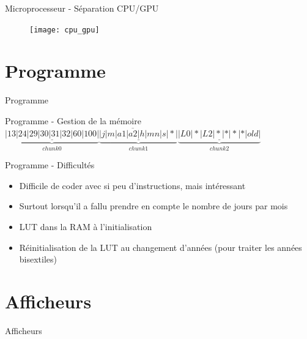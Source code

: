 \documentclass[handout]{beamer}
\begin{document}
\begin{frame}{Microprocesseur - Séparation CPU/GPU}
	\begin{figure}
		\centering
		\texttt{[image: cpu\_gpu]}
	\end{figure}
\end{frame}



\section{Programme}
\begin{frame}{Programme}
	
\end{frame}

\begin{frame}{Programme - Gestion de la mémoire}
	$\overline{\underbrace{\underline{|13|24|29|30|31|32|60|100|}}_{chunk 0}\underbrace{\underline{|j|m|a1|a2|h|mn|s|*|}}_{chunk 1}\underbrace{\underline{|L0|*|L2|*|*|*|*|old|}}_{chunk 2}}$
\end{frame}

\begin{frame}{Programme - Difficultés}
	\begin{itemize}
		\item Difficile de coder avec si peu d'instructions, mais intéressant
		\item Surtout lorsqu'il a fallu prendre en compte le nombre de jours par mois
		\item LUT dans la RAM à l'initialisation
		\item Réinitialisation de la LUT au changement d'années (pour traiter les années bisextiles)
	\end{itemize}
\end{frame}


\section{Afficheurs}
\begin{frame}{Afficheurs}
	
\end{frame}
\end{document}
